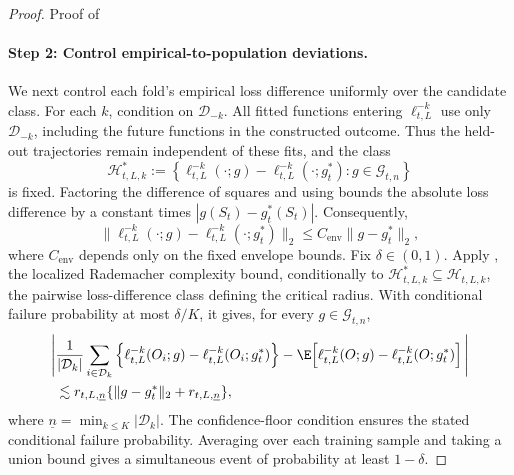 \documentclass[opre,nonblindrev]{informs4}
\providecommand{\cD}{\mathcal D}
\providecommand{\cG}{\mathcal G}
\newcommand{\norm}[1]{\lVert#1\rVert}
\begin{document}
\begin{proof}{Proof of }
\paragraph{Step 2: Control empirical-to-population deviations.}
We next control each fold's empirical loss difference uniformly over the
candidate class. For each $k$, condition on $\cD_{-k}$.
All fitted functions entering $\ell_{t,L}^{-k}$ use only $\cD_{-k}$,
including the future functions in the constructed outcome. Thus the
held-out trajectories remain independent of these fits, and the class
\[
\mathcal H_{t,L,k}^{*}
:=
\left\{
\ell_{t,L}^{-k}(\mathord\cdot;g)
-\ell_{t,L}^{-k}(\mathord\cdot;g_t^*)
:
g\in\cG_{t,n}
\right\}
\]
is fixed. Factoring the difference of squares and using
 bounds the absolute loss difference by a
constant times $|g(S_t)-g_t^*(S_t)|$. Consequently,
\[
\norm{
\ell_{t,L}^{-k}(\mathord\cdot;g)
-\ell_{t,L}^{-k}(\mathord\cdot;g_t^*)
}_2
\leq
C_{\mathrm{env}}\norm{g-g_t^*}_2,
\]
where $C_{\mathrm{env}}$ depends only on the fixed envelope bounds.
Fix $\delta\in(0,1)$. Apply , the localized Rademacher complexity bound, conditionally to
$\mathcal H_{t,L,k}^{*}\subseteq\mathcal H_{t,L,k}$, the pairwise
loss-difference class defining the critical radius. With conditional
failure probability at most $\delta/K$, it gives, for every $g\in\cG_{t,n}$,
\[
\begin{aligned}
\Bigg|&\frac{1}{|\cD_k|}\sum_{i\in\cD_k}
\left\{\ell_{t,L}^{-k}(O_i;g)-\ell_{t,L}^{-k}(O_i;g_t^*)\right\}-\E\!\left[
\ell_{t,L}^{-k}(O;g)-\ell_{t,L}^{-k}(O;g_t^*)
\right]\Bigg|\\
&\lesssim r_{t,L,\underline n}
\{\norm{g-g_t^*}_2+r_{t,L,\underline n}\},
\end{aligned}
\]
where $\underline n=\min_{k\leq K}|\cD_k|$. The confidence-floor condition ensures
the stated conditional failure probability. Averaging over each training
sample and taking a union bound gives a simultaneous event of probability
at least $1-\delta$. 


\end{proof}
\end{document}
